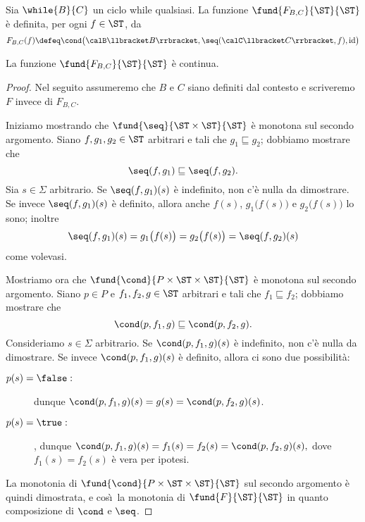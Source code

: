 \begin{definizione}
Sia $\while{B}{C}$ un ciclo while qualsiasi.
La funzione $\fund{F_{B,C}}{\ST}{\ST}$ \`e definita,
per ogni $f \in \ST$, da
\[
  F_{B,C}(f)
    \defeq
      \cond\bigl(\calB \llbracket B \rrbracket,
                         \seq(\calC \llbracket C \rrbracket, f),
                         \mathrm{id}\bigr)
\]
\end{definizione}

\begin{teorema}
La funzione $\fund{F_{B,C}}{\ST}{\ST}$ è continua.
\end{teorema}

\begin{proof}
Nel seguito assumeremo che $B$ e $C$ siano definiti dal contesto e scriveremo
$F$ invece di $F_{B,C}$.

Iniziamo mostrando che $\fund{\seq}{\ST \times \ST}{\ST}$
è monotona sul secondo argomento.
Siano $f, g_1, g_2 \in \ST$ arbitrari e tali che
$g_1 \sqsubseteq g_2$;  dobbiamo mostrare che
\[
  \seq(f, g_1) \sqsubseteq \seq(f, g_2).
\]
Sia $s \in \Sigma$ arbitrario.
Se $\seq(f, g_1)(s)$ \`e indefinito, non c'\`e nulla da dimostrare.
Se invece $\seq(f, g_1)(s)$ \`e definito,
allora anche $f(s)$, $g_1\bigl(f(s)\bigr)$ e $g_2\bigl(f(s)\bigr)$
lo sono;  inoltre
\[
    \seq(f, g_1)(s) = g_1\bigl(f(s)\bigr)
                    = g_2\bigl(f(s)\bigr)
  = \seq(f, g_2)(s)
\]
come volevasi.

Mostriamo ora che $\fund{\cond}{P \times \ST \times \ST}{\ST}$
è monotona sul secondo argomento.
Siano $p \in P$ e $f_1, f_2, g \in \ST$ arbitrari e tali che
$f_1 \sqsubseteq f_2$;  dobbiamo mostrare che
\[
  \cond(p, f_1, g) \sqsubseteq \cond(p, f_2, g).
\]
Consideriamo $s \in \Sigma$ arbitrario.
Se $\cond(p, f_1, g)(s)$ \`e indefinito, non c'\`e nulla da dimostrare.
Se invece $\cond(p, f_1, g)(s)$ \`e definito,
allora ci sono due possibilità:
\begin{description}
\item[$p(s) = \false:$] dunque
\(
  \cond(p, f_1, g)(s) = g(s) = \cond(p, f_2, g)(s)
\).
\item[$p(s) = \true:$], dunque
\(
  \cond(p, f_1, g)(s) = f_1(s) = f_2(s) = \cond(p, f_2, g)(s),
\)
dove $f_1(s) = f_2(s)$ è vera per ipotesi.
\end{description}
La monotonia di $\fund{\cond}{P \times \ST \times \ST}{\ST}$
sul secondo argomento è quindi dimostrata, e cos\`\i\ la monotonia
di $\fund{F}{\ST}{\ST}$ in quanto composizione di $\cond$ e $\seq$.


\end{proof}
